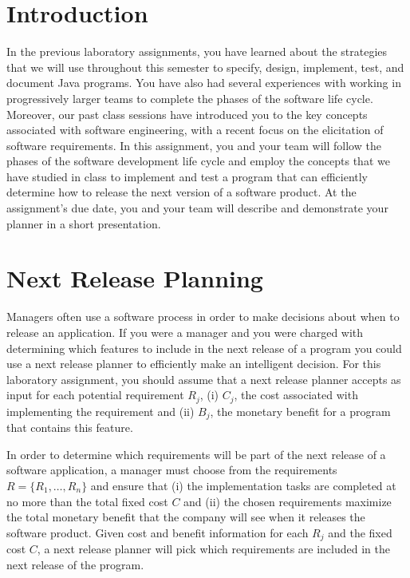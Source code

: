 

\usepackage[compact]{titlesec}



\section*{Introduction}

In the previous laboratory assignments, you have learned about the strategies that we will use throughout this semester
to specify, design, implement, test, and document Java programs.  You have also had several experiences with working in
progressively larger teams to complete the phases of the software life cycle.  Moreover, our past class sessions have
introduced you to the key concepts associated with software engineering, with a recent focus on the elicitation of
software requirements.  In this assignment, you and your team will follow the phases of the software development life
cycle and employ the concepts that we have studied in class to implement and test a program that can efficiently
determine how to release the next version of a software product. At the assignment's due date, you and your team will
describe and demonstrate your planner in a short presentation.

\section*{Next Release Planning}

Managers often use a software process in order to make decisions about when to release an application.  If you were a
manager and you were charged with determining which features to include in the next release of a program you could
use a next release planner to efficiently make an intelligent decision.  For this laboratory assignment, you should
assume that a next release planner accepts as input for each potential requirement $R_j$, (i) $C_j$, the cost associated with
implementing the requirement and (ii) $B_j$, the monetary benefit for a program that contains this feature.

In order to determine which requirements will be part of the next release of a software application, a manager must
choose from the requirements $R = \{ R_1, \ldots, R_n \}$ and ensure that (i) the implementation tasks are completed at
no more than the total fixed cost $C$ and (ii) the chosen requirements maximize the total monetary benefit that the
company will see when it releases the software product.  Given cost and benefit information for each $R_j$ and the fixed
cost $C$, a next release planner will pick which requirements are included in the next release of the program.

